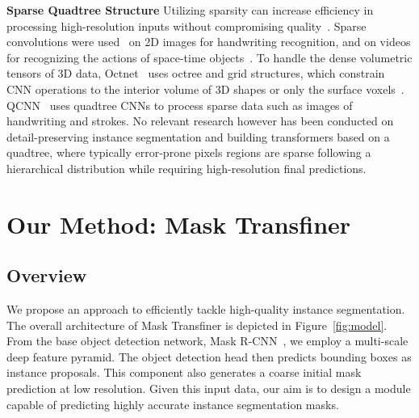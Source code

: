 \documentclass[10pt,twocolumn,letterpaper]{article}
\newcommand{\parsection}[1]{\vspace{1mm}\noindent\textbf{#1}}
\begin{document}
\parsection{Sparse Quadtree Structure}
Utilizing sparsity can increase efficiency in processing high-resolution inputs without compromising quality~\cite{liu2015sparse}. Sparse convolutions were used~\cite{graham2014spatially} on 2D images for handwriting recognition, and on videos for recognizing the actions of space-time objects~\cite{graham2015sparse}. To handle the dense volumetric tensors of 3D data, Octnet~\cite{riegler2017octnet} uses octree and grid structures, which constrain CNN operations to the interior volume of 3D shapes or only the surface voxels~\cite{wang2017cnn}. QCNN~\cite{qcnn} uses quadtree CNNs to process sparse data such as images of handwriting and strokes. No relevant research however has been conducted on detail-preserving instance segmentation and building transformers based on a quadtree, where typically error-prone pixels regions are sparse following a hierarchical distribution while requiring high-resolution final predictions.



\section{Our Method: Mask Transfiner}


\subsection{Overview}



We propose an approach to efficiently tackle high-quality instance segmentation. The overall architecture of Mask Transfiner is depicted in Figure~\ref{fig:model}. From the base object detection network, \eg Mask R-CNN~\cite{he2017mask}, we employ a multi-scale deep feature pyramid. The object detection head then predicts bounding boxes as instance proposals. This component also generates a coarse initial mask prediction at low resolution. Given this input data, our aim is to design a module capable of predicting highly accurate instance segmentation masks.
\end{document}
